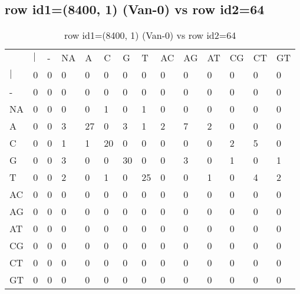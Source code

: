 \subsection{row id1=(8400, 1) (Van-0) vs row id2=64}
\begin{center}
\begin{longtable}{|l|l|l|l|l|l|l|l|l|l|l|l|l|l|}
\caption{row id1=(8400, 1) (Van-0) vs row id2=64} \label{table_dm460}\\
\hline
\\
\hline
&$|$&-&NA&A&C&G&T&AC&AG&AT&CG&CT&GT\\
$|$&0&0&0&0&0&0&0&0&0&0&0&0&0\\
-&0&0&0&0&0&0&0&0&0&0&0&0&0\\
NA&0&0&0&0&1&0&1&0&0&0&0&0&0\\
A&0&0&3&27&0&3&1&2&7&2&0&0&0\\
C&0&0&1&1&20&0&0&0&0&0&2&5&0\\
G&0&0&3&0&0&30&0&0&3&0&1&0&1\\
T&0&0&2&0&1&0&25&0&0&1&0&4&2\\
AC&0&0&0&0&0&0&0&0&0&0&0&0&0\\
AG&0&0&0&0&0&0&0&0&0&0&0&0&0\\
AT&0&0&0&0&0&0&0&0&0&0&0&0&0\\
CG&0&0&0&0&0&0&0&0&0&0&0&0&0\\
CT&0&0&0&0&0&0&0&0&0&0&0&0&0\\
GT&0&0&0&0&0&0&0&0&0&0&0&0&0\\
\hline
\end{longtable}
\end{center}

